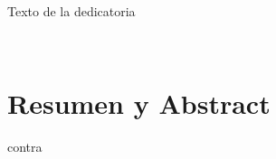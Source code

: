 \documentclass[11pt, twoside]{book}  %
\author{Isabel María del Águila Cano}
\begin{document}
\frontmatter

\portada

\begin{dedicatoria}
    Texto de la dedicatoria
\end{dedicatoria}




\


\chapter*{Resumen y Abstract}




\mainmatter
\marcagua









\appendix


%

\clearpage
\backmatter
 {contra}
\end{document}
